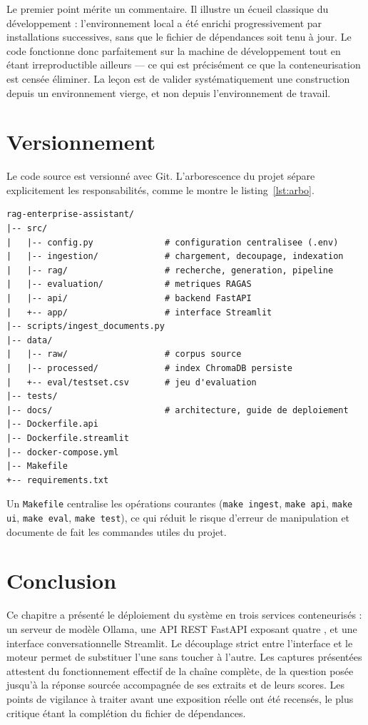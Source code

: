 Le premier point mérite un commentaire. Il illustre un écueil classique du
développement : l'environnement local a été enrichi progressivement par
installations successives, sans que le fichier de dépendances soit tenu à jour.
Le code fonctionne donc parfaitement sur la machine de développement tout en
étant irreproductible ailleurs --- ce qui est précisément ce que la
conteneurisation est censée éliminer. La leçon est de valider systématiquement
une construction depuis un environnement vierge, et non depuis l'environnement de
travail.

\section{Versionnement}

Le code source est versionné avec Git. L'arborescence du projet sépare
explicitement les responsabilités, comme le montre le
listing~\ref{lst:arbo}.

\begin{lstlisting}[style=plain,caption={Organisation du dépôt},label={lst:arbo}]
rag-enterprise-assistant/
|-- src/
|   |-- config.py              # configuration centralisee (.env)
|   |-- ingestion/             # chargement, decoupage, indexation
|   |-- rag/                   # recherche, generation, pipeline
|   |-- evaluation/            # metriques RAGAS
|   |-- api/                   # backend FastAPI
|   +-- app/                   # interface Streamlit
|-- scripts/ingest_documents.py
|-- data/
|   |-- raw/                   # corpus source
|   |-- processed/             # index ChromaDB persiste
|   +-- eval/testset.csv       # jeu d'evaluation
|-- tests/
|-- docs/                      # architecture, guide de deploiement
|-- Dockerfile.api
|-- Dockerfile.streamlit
|-- docker-compose.yml
|-- Makefile
+-- requirements.txt
\end{lstlisting}

Un \texttt{Makefile} centralise les opérations courantes
(\texttt{make ingest}, \texttt{make api}, \texttt{make ui}, \texttt{make eval},
\texttt{make test}), ce qui réduit le risque d'erreur de manipulation et
documente de fait les commandes utiles du projet.

\section{Conclusion}

Ce chapitre a présenté le déploiement du système en trois services conteneurisés :
un serveur de modèle Ollama, une API REST FastAPI exposant quatre
, et une interface conversationnelle Streamlit. Le découplage
strict entre l'interface et le moteur permet de substituer l'une sans toucher à
l'autre. Les captures présentées attestent du fonctionnement effectif de la
chaîne complète, de la question posée jusqu'à la réponse sourcée accompagnée de
ses extraits et de leurs scores. Les points de vigilance à traiter avant une
exposition réelle ont été recensés, le plus critique étant la complétion du
fichier de dépendances.
